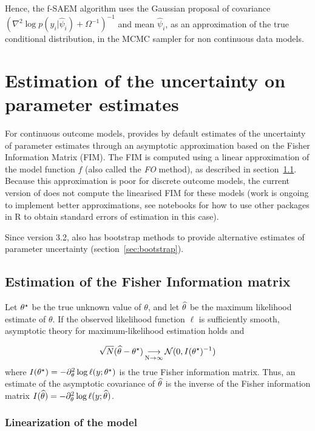 Hence, the f-SAEM algorithm uses the Gaussian proposal of covariance $\left( \nabla^2 \log p(y_i|\hat{\psi}_i) + \Omega^{-1}\right)^{-1}$ and mean $\hat{\psi}_i$, as an approximation of the true conditional distribution, in the MCMC sampler for non continuous data models.

\section{Estimation of the uncertainty on parameter estimates} \label{sec:SE} 

For continuous outcome models, \monolix provides by default estimates of the uncertainty of parameter estimates through an asymptotic approximation based on the Fisher Information Matrix (FIM). The FIM is computed using a linear approximation of the model function $f$ (also called the {\itshape FO} method), as described in section~\ref{sec:FIM}. Because this approximation is poor for discrete outcome models, the current version of \monolix does not compute the linearised FIM for these models (work is ongoing to implement better approximations, see notebooks for how to use other packages in {\sf R} to obtain standard errors of estimation in this case).

Since version 3.2, \monolix also has bootstrap methods to provide alternative estimates of parameter uncertainty (section~\ref{sec:bootstrap}).

\subsection{Estimation of the Fisher Information matrix} \label{sec:FIM} 

Let ${\theta^\star}$ be the true unknown value of $\theta$, and let ${\widehat{\theta}}$ be the maximum likelihood estimate of $\theta$. If the observed likelihood function $\ell$ is sufficiently smooth, asymptotic theory for maximum-likelihood estimation holds and

\begin{equation}
\sqrt{N}({\widehat{\theta}}-{\theta^\star}) \mathop{\longrightarrow}\limits_{\mathrm{N\to \infty}}^{\mathrm{}} {\mathcal N}(0,I({\theta^\star})^{-1})
\end{equation}
where $I({\theta^\star})=- \partial^2_\theta \log \ell(y;{\theta^\star})$ is the true Fisher information matrix. Thus, an estimate of the asymptotic covariance of ${\widehat{\theta}}$ is the  inverse of the Fisher information matrix $I({\widehat{\theta}})=- \partial^2_\theta \log \ell(y;{\widehat{\theta}})$.

\subsubsection{Linearization of the model}

